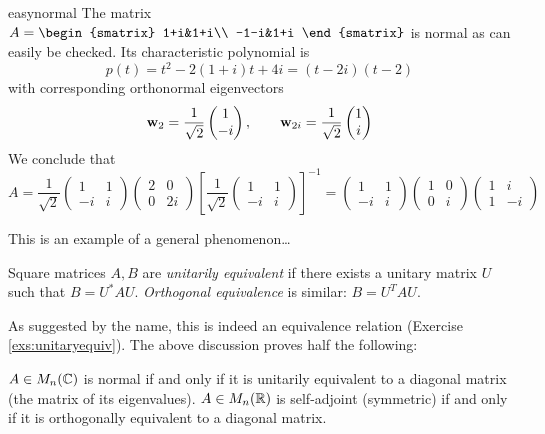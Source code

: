 \begin{example}{}{easynormal}
	The matrix $A=
	\begin{smatrix}
		1+i&1+i\\
		-1-i&1+i
	\end{smatrix}$
	is normal as can easily be checked. Its characteristic polynomial is
	\[
		p(t)=t^2-2(1+i)t+4i=(t-2i)(t-2)
	\]
	with corresponding orthonormal eigenvectors
	\[
		{\mathbf{w}}_2=\frac 1{\sqrt 2}\begin{pmatrix}1\\-i\end{pmatrix},\qquad {\mathbf{w}}_{2i}=\frac 1{\sqrt 2}\begin{pmatrix}1\\i\end{pmatrix}
	\]
	We conclude that
	\[
		A=\frac 1{\sqrt 2}
		\begin{pmatrix}
			1&1\\
			-i&i
		\end{pmatrix}
		\begin{pmatrix}
			2&0\\
			0&2i
		\end{pmatrix}
		\left[\frac 1{\sqrt 2}
		\begin{pmatrix}
			1&1\\
			-i&i
		\end{pmatrix}
		\right]^{-1}
		=
		\begin{pmatrix}
			1&1\\
			-i&i
		\end{pmatrix}
		\begin{pmatrix}
			1&0\\
			0&i
		\end{pmatrix}
		\begin{pmatrix}
			1&i\\
			1&-i
		\end{pmatrix}
	\]
\end{example}

This is an example of a general phenomenon\ldots

\begin{defn}{}{}
	Square matrices $A,B$ are \emph{unitarily equivalent} if there exists a unitary matrix $U$ such that $B=U^*AU$. \emph{Orthogonal equivalence} is similar: $B=U^TAU$.
\end{defn}

As suggested by the name, this is indeed an equivalence relation (Exercise \ref{exs:unitaryequiv}). The above discussion proves half the following:

\begin{thm}{}{}
	$A\in M_n(\mathbb{C})$ is normal if and only if it is unitarily equivalent to a diagonal matrix (the matrix of its eigenvalues).\smallbreak
	$A\in M_n(\mathbb{R})$ is self-adjoint (symmetric) if and only if it is orthogonally equivalent to a diagonal matrix. 
\end{thm}

